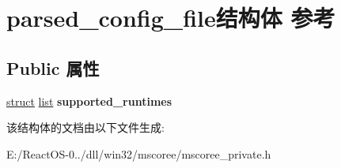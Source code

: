 \hypertarget{structparsed__config__file}{}\section{parsed\+\_\+config\+\_\+file结构体 参考}
\label{structparsed__config__file}
\subsection*{Public 属性}
\begin{DoxyCompactItemize}
\item 
\mbox{\label{structparsed__config__file_a3dcda2d1a98276a52c37c1b7d2db9583}} 
\hyperlink{interfacestruct}{struct} \hyperlink{classlist}{list} {\bfseries supported\+\_\+runtimes}
\end{DoxyCompactItemize}


该结构体的文档由以下文件生成\+:\begin{DoxyCompactItemize}
\item 
E\+:/\+React\+O\+S-\/0../dll/win32/mscoree/mscoree\+\_\+private.\+h\end{DoxyCompactItemize}
